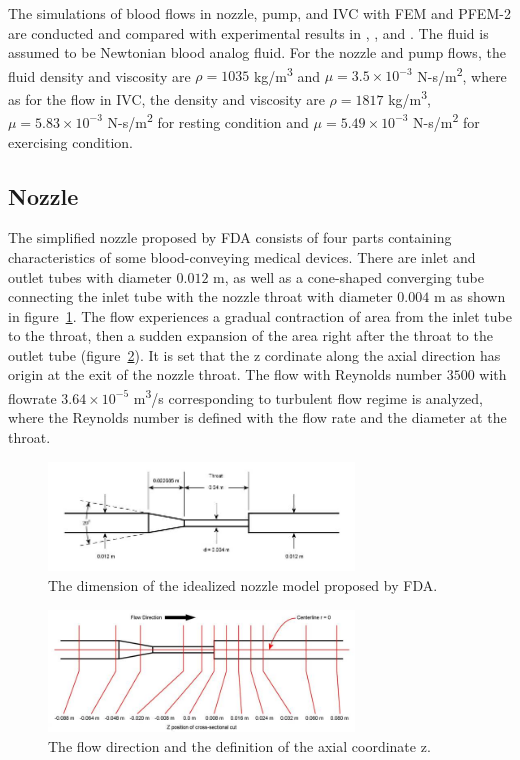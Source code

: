 The simulations of blood flows in nozzle, pump, and IVC with FEM and PFEM-2 are conducted and compared with experimental results in \cite{fda_res}, \cite{fda_nozzle}, \cite{fda_pump} and \cite{gallagher_exp}. The fluid is assumed to be Newtonian blood analog fluid. For the nozzle and pump flows, the fluid density and viscosity are $\rho= 1035$ kg/m\textsuperscript{3} and $\mu =3.5\times10^{-3}$ N-s/m\textsuperscript{2}, where as for the flow in IVC, the density and viscosity are $\rho=1817$ kg/m\textsuperscript{3}, $\mu=5.83\times10^{-3}$ N-s/m\textsuperscript{2} for resting condition and $\mu=5.49\times10^{-3}$ N-s/m\textsuperscript{2} for exercising condition. 

\subsection{Nozzle}

The simplified nozzle proposed by FDA consists of four parts containing characteristics of some blood-conveying medical devices. There are inlet and outlet tubes with diameter $0.012$ m, as well as a cone-shaped converging tube connecting the inlet tube with the nozzle throat with diameter $0.004$ m as shown in figure~\ref{fig:nozzlegeo1}. The flow experiences a gradual contraction of area from the inlet tube to the throat, then a sudden expansion of the area right after the throat to the outlet tube (figure~\ref{fig:nozzlegeo2}). It is set that the z cordinate along the axial direction has origin at the exit of the nozzle throat. The flow with Reynolds number $3500$ with flowrate $3.64\times10^{-5}$ m\textsuperscript{3}/s corresponding to turbulent flow regime is analyzed, where the Reynolds number is defined with the flow rate and the diameter at the throat. 

\begin{figure}[htbp]
    \centering
    \includegraphics[width=3.2in]{imgs/nozzle_pump/nozzle_geo.jpg}
    \caption{The dimension of the idealized nozzle model proposed by FDA.}
    \label{fig:nozzlegeo1}
\end{figure}
\begin{figure}[htbp]
    \centering
    \includegraphics[width=3.2in]{imgs/nozzle_pump/nozzle_CS.jpg}
    \caption{The flow direction and the definition of the axial coordinate z.}
    \label{fig:nozzlegeo2}
\end{figure}

